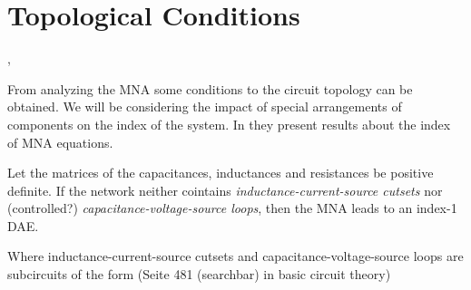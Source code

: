 \section{Topological Conditions} 
\cite{Tischendorf2005Topological}, %
\cite{ModellingAndDiscretizationOfCircuitProblems}
\cite{DesoerCharlesA1969Bct}

From analyzing the MNA some conditions to the circuit topology can be obtained. We will be considering the impact of special arrangements of components on the index of the system. In \cite{Tischendorf2005Topological} they present results about the index of MNA equations.


\begin{theorem} \label{Index-1 condition}
	Let the matrices of the capacitances, inductances and resistances be positive definite. If the network neither cointains \emph{inductance-current-source cutsets} nor (controlled?) \emph{capacitance-voltage-source loops}, then the MNA leads to an index-1 DAE.
\end{theorem}

Where inductance-current-source cutsets and capacitance-voltage-source loops are subcircuits of the form (Seite 481 (searchbar) in basic circuit theory)

